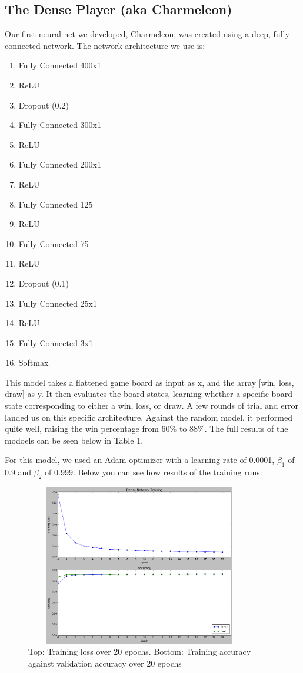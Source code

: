 
\subsection{The Dense Player (aka Charmeleon)}

Our first neural net we developed, Charmeleon, was created using a deep, fully connected  network.
The network architecture we use is:
\begin{enumerate}
	\item Fully Connected 400x1
	\item ReLU
	\item Dropout (0.2)
	\item Fully Connected 300x1
	\item ReLU
	\item Fully Connected 200x1
	\item ReLU
	\item Fully Connected 125
	\item ReLU
	\item Fully Connected 75
	\item ReLU
	\item Dropout (0.1)
	\item Fully Connected 25x1
	\item ReLU
	\item Fully Connected 3x1
	\item Softmax
\end{enumerate}
This model takes a flattened game board as input as x, and the array [win, loss, draw] as y. It then evaluates the board states, learning whether a specific board state corresponding to either a win, loss, or draw. A few rounds of trial and error landed us on this specific architecture. Against the random model, it performed quite well, raising the win percentage from 60\% to 88\%. The full results of the modoels can be seen below in Table 1. 

For this model, we used an Adam optimizer with a learning rate of 0.0001, $\beta_1$ of 0.9 and $\beta_2$ of 0.999. Below you can see how results of the training runs:

\begin{figure}[h!]
	\centering
	\includegraphics[width=10cm, height=7cm]{dense-net-training.png}
	\caption{Top: Training loss over 20 epochs. Bottom: Training accuracy against validation accuracy over 20 epochs}
	\label{fig:conv_net}
\end{figure}
